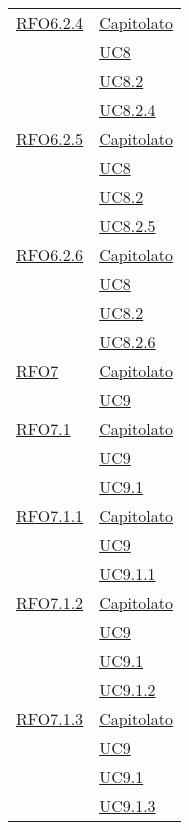 \begin{longtable}{|>{\centering}m{5cm}|m{5cm}<{\centering}|}
  \hyperlink{RFO6.2.4}{RFO6.2.4} & \hyperlink{Capitolato}{Capitolato}\\
  & \hyperref[UC8]{UC8}\\
  & \hyperref[UC8.2]{UC8.2}\\
  & \hyperref[UC8.2.4]{UC8.2.4}\\\hline
  
   \hyperlink{RFO6.2.5}{RFO6.2.5} & \hyperlink{Capitolato}{Capitolato}\\
  & \hyperref[UC8]{UC8}\\
  & \hyperref[UC8.2]{UC8.2}\\
  & \hyperref[UC8.2.5]{UC8.2.5}\\\hline
  
   \hyperlink{RFO6.2.6}{RFO6.2.6} & \hyperlink{Capitolato}{Capitolato}\\
  & \hyperref[UC8]{UC8}\\
  & \hyperref[UC8.2]{UC8.2}\\
  & \hyperref[UC8.2.6]{UC8.2.6}\\\hline
  
   \hyperlink{RFO7}{RFO7} & \hyperlink{Capitolato}{Capitolato}\\
  & \hyperref[UC9]{UC9}\\\hline
  
    \hyperlink{RFO7.1}{RFO7.1} & \hyperlink{Capitolato}{Capitolato}\\
  & \hyperref[UC9]{UC9}\\
   & \hyperref[UC9.1]{UC9.1}\\\hline
   
    \hyperlink{RFO7.1.1}{RFO7.1.1} & \hyperlink{Capitolato}{Capitolato}\\
   & \hyperref[UC9]{UC9}\\
   & \hyperref[UC9.1.1]{UC9.1.1}\\\hline
   
   \hyperlink{RFO7.1.2}{RFO7.1.2} & \hyperlink{Capitolato}{Capitolato}\\
   & \hyperref[UC9]{UC9}\\
   & \hyperref[UC9.1]{UC9.1}\\
   & \hyperref[UC9.1.2]{UC9.1.2}\\\hline
   
   \hyperlink{RFO7.1.3}{RFO7.1.3} & \hyperlink{Capitolato}{Capitolato}\\
   & \hyperref[UC9]{UC9}\\
   & \hyperref[UC9.1]{UC9.1}\\
   & \hyperref[UC9.1.3]{UC9.1.3}\\\hline
   

\end{longtable}
